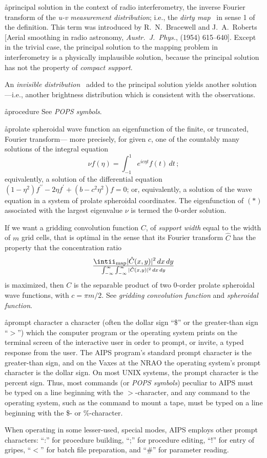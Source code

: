 \aa{principal solution}
in the context of radio interferometry,
the inverse Fourier transform of the {\it u-v measurement distribution};
i.e., the {\it dirty map} \qv\ in sense 1 of the definition.
This term was introduced by R.~N.~Bracewell and J.~A.~Roberts
[Aerial smoothing in radio astronomy, {\it Austr.\ J.~Phys.},
 (1954) 615--640].
Except in the trivial case, the principal solution to the mapping
problem in interferometry is a physically implausible solution,
because the principal solution has not the property of {\it compact support}.
\par
An {\it invisible distribution} \qv\ added to the principal solution
yields another solution---i.e., another
brightness distribution which is consistent with the observations.

\aa{procedure} See {\it POPS symbols}.

\aa{prolate spheroidal wave function}
an eigenfunction of the finite, or truncated, Fourier transform---%
more precisely, for given $c$, one of the countably many solutions
of the integral equation
$$\nu f(\eta)=\int_{-1}^1e^{ic\eta t}f(t)\,dt\,;\tag{$\ast$}$$
equivalently, a solution of the differential equation
$(1-\eta^2)f^{\prime\prime}-2\eta f^\prime+(b-c^2\eta^2)f=0$;
or, equivalently, a solution of the wave equation in a system
of prolate spheroidal coordinates.
The eigenfunction of $(\ast)$ associated with the largest eigenvalue
$\nu$ is termed the 0-order solution.
\par
If we want a gridding convolution function $C$,
of {\it support width} equal to the width of $m$ grid cells,
that is optimal in the sense that its Fourier transform $\hat C$
has the property that
the concentration ratio
$$\intii_{\operatorname{map}} |\hat C(x,y)|^2\,dx\,dy\over
\int_{-\infty}^\infty\int_{-\infty}^\infty|\hat C(x,y)|^2\,dx\,dy$$
is maximized, then $C$ is the separable product of two
0-order prolate spheroidal wave functions, with $c=\pi m/2$.
See {\it gridding convolution function} and {\it spheroidal function}.

\aa{prompt character}
a character (often the dollar sign ``\$'' or the greater-than
sign ``$>$'') which the computer program or the operating system
prints on the terminal screen of the interactive user in
order to prompt, or invite, a typed response from the user.
The AIPS program's standard prompt character is the greater-than
sign, and on the Vaxes at the NRAO the operating
system's prompt character is the dollar sign.  On most UNIX systems,
the prompt character is the percent sign.  Thus, most commands (or
{\it POPS symbols}\/) peculiar to AIPS must be typed on a line
beginning with the $>$-character, and any command to the
operating system, such as the command to mount a tape,
must be typed on a line beginning with the \$- or \%-character.
\par
When operating in some lesser-used, special modes,
AIPS employs other prompt characters:
``:'' for procedure building, ``;'' for procedure editing,
``!'' for entry of gripes, ``$<$'' for batch file preparation,
and ``\#'' for parameter reading.


